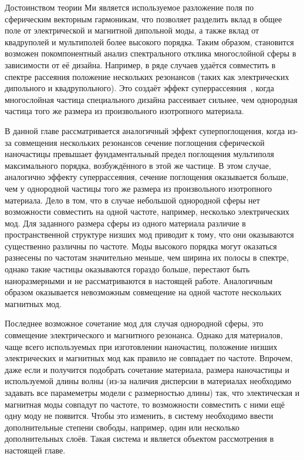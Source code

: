 Достоинством теории Ми является используемое разложение поля по
сферическим векторным гармоникам, что позволяет разделить вклад в
общее поле от электрической и магнитной дипольной моды, а также вклад
от квадруполей и мультиполей более высокого порядка. Таким образом,
становится возможен покомпонентный анализ спектрального отклика
многослойной сферы в зависимости от её дизайна. Например, в ряде
случаев удаётся совместить в спектре рассеяния положение нескольких
резонансов (таких как электрических дипольного и квадрупольного). Это
создаёт эффект суперрассеяния~\cite{Fan-2010,Fan-2011}, когда
многослойная частица специального дизайна рассеивает сильнее, чем
однородная частица того же размера из произвольного изотропного
материала.

В данной главе рассматривается аналогичный эффект суперпоглощения,
когда из-за совмещения нескольких резонансов сечение поглощения
сферической наночастицы превышает фундаментальный предел поглощения
мультиполя максимального порядка, возбуждённого в этой же частице.  В
этом случае, аналогично эффекту суперрассеяния, сечение поглощения
оказывается больше, чем у однородной частицы того же размера из
произвольного изотропного материала. Дело в том, что в случае
небольшой однородной сферы нет возможности совместить на одной
частоте, например, несколько электрических мод. Для заданного размера
сферы из одного материала различие в пространственной структуре низших
мод приводит к тому, что они оказываются существенно различны по
частоте. Моды высокого порядка могут оказаться разнесены по частотам
значительно меньше, чем ширина их полосы в спектре, однако такие
частицы оказываются гораздо больше, перестают быть наноразмерными и не
рассматриваются в настоящей работе. Аналогичным образом оказывается
невозможным совмещение на одной частоте нескольких магнитных мод.

Последнее возможное сочетание мод для случая однородной сферы, это
совмещение электрического и магнитного резонанса. Однако для
материалов, чаще всего используемых при изготовлении наночастиц,
положение низших электрических и магнитных мод как правило не
совпадает по частоте.  Впрочем, даже если и получится подобрать
сочетание материала, размера наночастицы и используемой длины волны
(из-за наличия дисперсии в материалах необходимо задавать все
парамеметры модели с размерностью длины) так, что электическая и
магнитная моды совпадут по частоте, то возможности совместить с ними
ещё одну моду не появится.  Чтобы это изменить, в систему необходимо
ввести дополнительные степени свободы, например, один или несколько
дополнительных слоёв. Такая система и является объектом рассмотрения в
настоящей главе.

